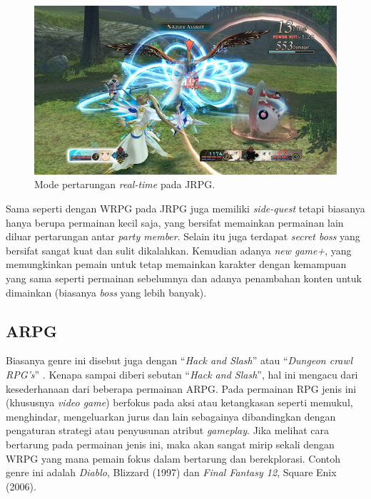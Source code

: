 \begin{figure} [!h] \centering
	\includegraphics[scale=0.25]{img/tales.png}
	\caption{Mode pertarungan \textit{real-time} pada JRPG.}
	\label{fig:tales}
\end{figure}

Sama seperti dengan WRPG pada JRPG juga memiliki \textit{side-quest} tetapi biasanya hanya berupa permainan kecil saja, yang bersifat memainkan permainan lain diluar pertarungan antar \textit{party member}. Selain itu juga terdapat \textit{secret boss} yang bersifat sangat kuat dan sulit dikalahkan. Kemudian adanya \textit{new game+}, yang memungkinkan pemain untuk tetap memainkan karakter dengan kemampuan yang sama seperti permainan sebelumnya dan adanya penambahan konten untuk dimainkan (biasanya \textit{boss} yang lebih banyak).
\vspace{1ex}

\subsection{ARPG}
\label{sec:sub_sec2_arpg}

Biasanya genre ini disebut juga dengan ``\textit{Hack and Slash}'' atau ``\textit{Dungeon crawl RPG's}'' \citep{moore2016}. Kenapa sampai diberi sebutan ``\textit{Hack and Slash}'', hal ini mengacu dari kesederhanaan dari beberapa permainan ARPG. Pada permainan RPG jenis ini (khususnya \textit{video game}) berfokus pada aksi atau ketangkasan seperti memukul, menghindar, mengeluarkan jurus dan lain sebagainya dibandingkan dengan pengaturan strategi atau penyusunan atribut \textit{gameplay}. Jika melihat cara bertarung pada permainan jenis ini, maka akan sangat mirip sekali dengan WRPG yang mana pemain fokus dalam bertarung dan berekplorasi. Contoh genre ini adalah \textit{Diablo}, Blizzard (1997) dan \textit{Final Fantasy 12}, Square Enix (2006).
\vspace{1ex}

